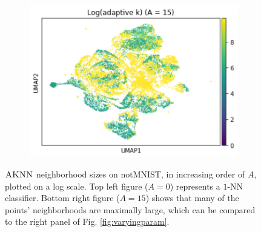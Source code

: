 \documentclass{article}
\newcommand{\algname}{\textsc{AKNN}}
\begin{document}
\begin{figure}
\begin{subfigure}[t]{0.32\textwidth}
        \includegraphics[width=\linewidth]{figs/notMNIST/notMNIST_logadaK_Aeq15.png} %
    \end{subfigure}
    \hfill
  \caption{$\algname$ neighborhood sizes on notMNIST, in increasing order of $A$, plotted on a log scale. Top left figure ($A = 0$) represents a $1$-NN classifier. Bottom right figure ($A = 15$) shows that many of the points' neighborhoods are maximally large, which can be compared to the right panel of Fig. \ref{fig:varyingparam}.}
  \label{fig:varyingadak}
\end{figure}
\end{document}
